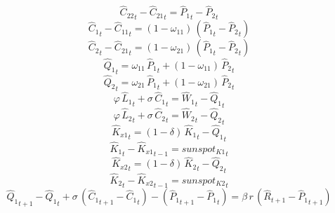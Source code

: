 \begin{dmath}
{{\hat{C}_{22}}}_{t}-{{\hat{C}_{21}}}_{t}={{\hat{P}_{1}}}_{t}-{{\hat{P}_{2}}}_{t}
\end{dmath}
\begin{dmath}
{{\hat{C}_{1}}}_{t}-{{\hat{C}_{11}}}_{t}=\left(1-{{\omega_{11}}}\right)\, \left({{\hat{P}_{1}}}_{t}-{{\hat{P}_{2}}}_{t}\right)
\end{dmath}
\begin{dmath}
{{\hat{C}_{2}}}_{t}-{{\hat{C}_{21}}}_{t}=\left(1-{{\omega_{21}}}\right)\, \left({{\hat{P}_{1}}}_{t}-{{\hat{P}_{2}}}_{t}\right)
\end{dmath}
\begin{dmath}
{{\hat{Q}_{1}}}_{t}={{\omega_{11}}}\, {{\hat{P}_{1}}}_{t}+\left(1-{{\omega_{11}}}\right)\, {{\hat{P}_{2}}}_{t}
\end{dmath}
\begin{dmath}
{{\hat{Q}_{2}}}_{t}={{\omega_{21}}}\, {{\hat{P}_{1}}}_{t}+\left(1-{{\omega_{21}}}\right)\, {{\hat{P}_{2}}}_{t}
\end{dmath}
\begin{dmath}
{{\varphi}}\, {{\hat{L}_{1}}}_{t}+{{\sigma}}\, {{\hat{C}_{1}}}_{t}={{\hat{W}_{1}}}_{t}-{{\hat{Q}_{1}}}_{t}
\end{dmath}
\begin{dmath}
{{\varphi}}\, {{\hat{L}_{2}}}_{t}+{{\sigma}}\, {{\hat{C}_{2}}}_{t}={{\hat{W}_{2}}}_{t}-{{\hat{Q}_{2}}}_{t}
\end{dmath}
\begin{dmath}
{{\hat{K}_{x1}}}_{t}=\left(1-{{\delta}}\right)\, {{\hat{K}_{1}}}_{t}-{{\hat{Q}_{1}}}_{t}
\end{dmath}
\begin{dmath}
{{\hat{K}_{1}}}_{t}-{{\hat{K}_{x1}}}_{t-1}={{sunspot_{K1}}}_{t}
\end{dmath}
\begin{dmath}
{{\hat{K}_{x2}}}_{t}=\left(1-{{\delta}}\right)\, {{\hat{K}_{2}}}_{t}-{{\hat{Q}_{2}}}_{t}
\end{dmath}
\begin{dmath}
{{\hat{K}_{2}}}_{t}-{{\hat{K}_{x2}}}_{t-1}={{sunspot_{K2}}}_{t}
\end{dmath}
\begin{dmath}
{{\hat{Q}_{1}}}_{t+1}-{{\hat{Q}_{1}}}_{t}+{{\sigma}}\, \left({{\hat{C}_{1}}}_{t+1}-{{\hat{C}_{1}}}_{t}\right)-\left({{\hat{P}_{1}}}_{t+1}-{{\hat{P}_{1}}}_{t}\right)={{\beta}}\, {r}\, \left({{\hat{R}}}_{t+1}-{{\hat{P}_{1}}}_{t+1}\right)
\end{dmath}
